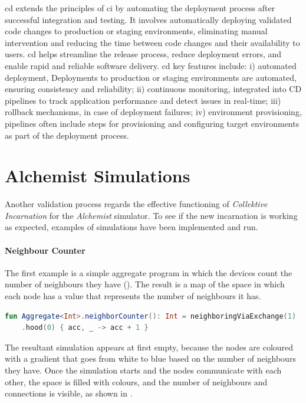 \ac{cd} extends the principles of \ac{ci} by automating the deployment process after successful integration and testing.
It involves automatically deploying validated code changes to production or staging environments, eliminating manual
intervention and reducing the time between code changes and their availability to users.
\ac{cd} helps streamline the release process, reduce deployment errors, and enable rapid and reliable software delivery.
\ac{cd} key features include:
    i) automated deployment, Deployments to production or staging environments are automated, ensuring consistency and reliability;
    ii) continuous monitoring, integrated into CD pipelines to track application performance and detect issues in real-time;
    iii) rollback mechanisms, in case of deployment failures;
    iv) environment provisioning, pipelines often include steps for provisioning and configuring target environments as part of the deployment process.

\section{Alchemist Simulations}
\label{sec:alchemist-simulations}
Another validation process regards the effective functioning of \emph{Collektive Incarnation} for the \emph{Alchemist} simulator.
To see if the new incarnation is working as expected, examples of simulations have been implemented and run.

\paragraph{Neighbour Counter}
The first example is a simple aggregate program in which the devices count the number of neighbours they have ().
The result is a map of the space in which each node has a value that represents the number of neighbours it has.

\begin{lstlisting}[language=kt, caption={Neighbour counter code example}, label={lst:neighbour-counter-example}]
fun Aggregate<Int>.neighborCounter(): Int = neighboringViaExchange(1)
    .hood(0) { acc, _ -> acc + 1 }
\end{lstlisting}

The resultant simulation appears at first empty, because the nodes are coloured with a gradient that goes from white to
blue based on the number of neighbours they have.
Once the simulation starts and the nodes communicate with each other, the space is filled with colours, and the number of
neighbours and connections is visible, as shown in .

